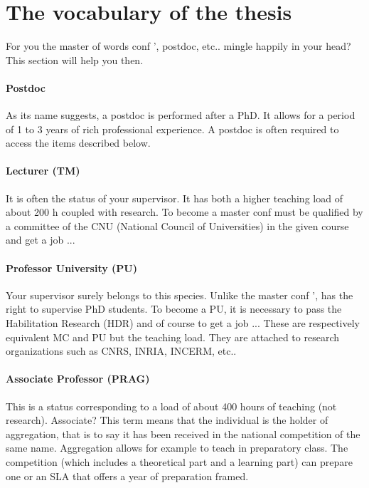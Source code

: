 \section{The vocabulary of the thesis}
For you the master of words conf ', postdoc, etc.. mingle happily in your head?
This section will help you then.
\paragraph {Postdoc}
As its name suggests, a postdoc is performed after a PhD.
It allows for a period of 1 to 3 years of rich professional experience.
A postdoc is often required to access the items described below.
\paragraph {Lecturer (TM)}
It is often the status of your supervisor.
It has both a higher teaching load of about 200 h coupled with research.
To become a master conf must be qualified by a committee of the CNU (National Council of Universities) in the given course and get a job ...
\paragraph{Professor University (PU)}
Your supervisor surely belongs to this species.
Unlike the master conf ', has the right to supervise PhD students.
To become a PU, it is necessary to pass the Habilitation Research (HDR) and of course to get a job ...
These are respectively equivalent MC and PU but the teaching load.
They are attached to research organizations such as CNRS, INRIA, INCERM, etc..
\paragraph {Associate Professor (PRAG)} This is a status corresponding to a load of about 400 hours of teaching (not research).
Associate? This term means that the individual is the holder of aggregation, that is to say it has been received in the national competition of the same name.
Aggregation allows for example to teach in preparatory class.
The competition (which includes a theoretical part and a learning part) can prepare one or an SLA that offers a year of preparation framed.

